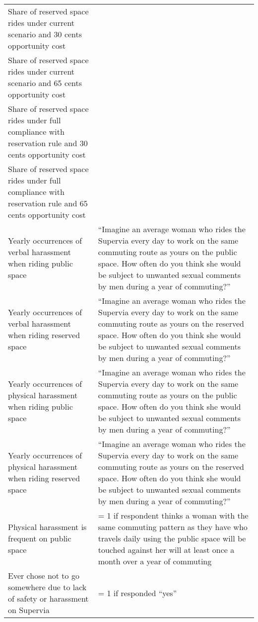 \begin{table}[H]
\begin{tabular}{p{.4\linewidth}p{.6\linewidth}}
Share of reserved space rides under current scenario and 30 cents opportunity cost	&		\\
Share of reserved space rides under current scenario and 65 cents opportunity cost	&		\\
Share of reserved space rides under full compliance with reservation rule and 30 cents opportunity cost	&		\\
Share of reserved space rides under full compliance with reservation rule and 65 cents opportunity cost		&		\\
Yearly occurrences of verbal harassment when riding public space	    & ``Imagine an average woman who rides the Supervia every day to work on the same commuting route as yours on the public space. How often do you think she would be subject to unwanted sexual comments by men during a year of commuting?'' \\
Yearly occurrences of verbal harassment when riding reserved space	    &  ``Imagine an average woman who rides the Supervia every day to work on the same commuting route as yours on the reserved space. How often do you think she would be subject to unwanted sexual comments by men during a year of commuting?'' \\
Yearly occurrences of physical harassment when riding public space	    &  ``Imagine an average woman who rides the Supervia every day to work on the same commuting route as yours on the public space. How often do you think she would be subject to unwanted sexual comments by men during a year of commuting?'' \\
Yearly occurrences of physical harassment when riding reserved space	& ``Imagine an average woman who rides the Supervia every day to work on the same commuting route as yours on the reserved space. How often do you think she would be subject to unwanted sexual comments by men during a year of commuting?'' \\
Physical harassment is frequent on public space & = 1 if respondent thinks a woman with the same commuting pattern as they have who travels daily using the public space will be touched against her will at least once a month over a year of commuting \\
Ever chose not to go somewhere due to lack of safety or harassment on Supervia & = 1 if responded ``yes''		\\
\hline\hline
    \end{tabular}
\end{table}


